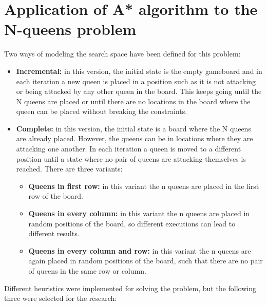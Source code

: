 \documentclass[]{llncs}
\begin{document}
\section{Application of A* algorithm to the N-queens problem}\label{astar_nqueens}
Two ways of modeling the search space have been defined for this problem:
\begin{itemize}
    \item \textbf{Incremental:} in this version, the initial state is the empty gameboard and in each iteration a new queen is placed in a position such as it is not attacking or being attacked by any other queen in the board. This keeps going until the N queens are placed or until there are no locations in the board where the queen can be placed without breaking the constraints.
    \item \textbf{Complete:} in this version, the initial state is a board where the N queens are already placed. However, the queens can be in locations where they are attacking one another. In each iteration a queen is moved to a different position until a state where no pair of queens are attacking themselves is reached. There are three variants:
        \begin{itemize}
            \item \textbf{Queens in first row:} in this variant the n queens are placed in the first row of the board.
            \item \textbf{Queens in every column:} in this variant the n queens are placed in random positions of the board, so different executions can lead to different results.
            \item \textbf{Queens in every column and row:} in this variant the n queens are again placed in random positions of the board, such that there are no pair of queens in the same row or column.
        \end{itemize}
\end{itemize}
Different heuristics were implemented for solving the problem, but the following three were selected for the research:
\end{document}
